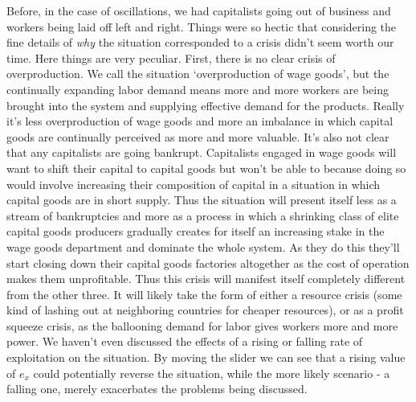 \documentclass{article}
\theoremstyle{theorem}
\begin{document}
Before, in the case of oscillations, we had capitalists going out of business and workers being laid off left and right. Things were so hectic that considering the fine details of \emph{why} the situation corresponded to a crisis didn't seem worth our time. Here things are very peculiar. First, there is no clear crisis of overproduction. We call the situation `overproduction of wage goods', but the continually expanding labor demand means more and more workers are being brought into the system and supplying effective demand for the products. Really it's less overproduction of wage goods and more an imbalance in which capital goods are continually perceived as more and more valuable. It's also not clear that any capitalists are going bankrupt. Capitalists engaged in wage goods will want to shift their capital to capital goods but won't be able to because doing so would involve increasing their composition of capital in a situation in which capital goods are in short supply. Thus the situation will present itself less as a stream of bankruptcies and more as a process in which a shrinking class of elite capital goods producers gradually creates for itself an increasing stake in the wage goods department and dominate the whole system. As they do this they'll start closing down their capital goods factories altogether as the cost of operation makes them unprofitable. Thus this crisis will manifest itself completely different from the other three. It will likely take the form of either a resource crisis (some kind of lashing out at neighboring countries for cheaper resources), or as a profit squeeze crisis, as the ballooning demand for labor gives workers more and more power. We haven't even discussed the effects of a rising or falling rate of exploitation on the situation. By moving the slider we can see that a rising value of $e_x$ could potentially reverse the situation, while the more likely scenario - a falling one, merely exacerbates the problems being discussed. \par 
\end{document}
